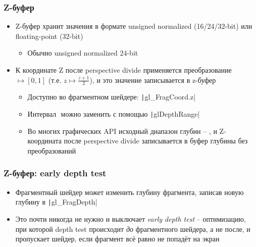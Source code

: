 \documentclass[10pt]{beamer}
\begin{document}
\begin{frame}[fragile]
\frametitle{Z-буфер}
\begin{itemize}
\item Z-буфер хранит значения в формате unsigned normalized (16/24/32-bit) или floating-point (32-bit)
\begin{itemize}
\item Обычно unsigned normalized 24-bit
\end{itemize}
\pause
\item К координате Z после perspective divide применяется преобразование \begin{math}[-1, 1] \mapsto [0, 1]\end{math} (т.е. \begin{math}z \mapsto \frac{z+1}{2}\end{math}), и это значение записывается в z-буфер
\pause
\begin{itemize}
\item Доступно во фрагментном шейдере: \texttt|gl_FragCoord.z|
\pause
\item Интервал \begin{math}[0, 1]\end{math} можно заменить с помощью \texttt|glDepthRange|
\pause
\item Во многих графических API исходный диапазон глубин -- \begin{math}[0, 1]\end{math}, и Z-координата после perspective divide записывается в буфер глубины без преобразований
\end{itemize}
\end{itemize}
\end{frame}

\begin{frame}[fragile]
\frametitle{Z-буфер: early depth test}
\begin{itemize}
\item Фрагментный шейдер может изменить глубину фрагмента, записав новую глубину в \texttt|gl_FragDepth|
\pause
\item Это почти никогда не нужно и выключает \textit{early depth test} -- оптимизацию, при которой depth test происходит \textit{до} фрагментного шейдера, а не после, и пропускает шейдер, если фрагмент всё равно не попадёт на экран
\end{itemize}
\end{frame}
\end{document}
